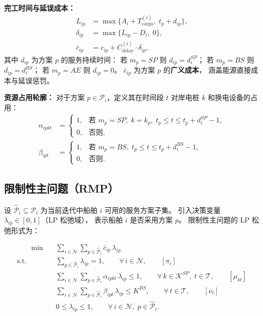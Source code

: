 \documentclass[11pt,a4paper]{article}
\begin{document}
\noindent\textbf{完工时间与延误成本：}
\begin{align}
  L_{ip} &= \max\!\Big\{A_i + T_{\text{cargo}}^{(i)},\;
    t_p + d_{ip}\Big\},
  \tag{20} \\[4pt]
  \delta_{ip} &= \max\!\big\{L_{ip} - D_i,\; 0\big\},
  \tag{21} \\[4pt]
  \bar{c}_{ip} &= c_{ip} + C_{\text{delay}}^{(i)} \cdot \delta_{ip},
  \tag{22}
\end{align}
%
其中 $d_{ip}$ 为方案 $p$ 的服务持续时间：
若 $m_p = SP$ 则 $d_{ip} = d_i^{SP}$；
若 $m_p = BS$ 则 $d_{ip} = d_i^{BS}$；
若 $m_p = AE$ 则 $d_{ip} = 0$。
$\bar{c}_{ip}$ 为方案 $p$ 的\textbf{广义成本}，
涵盖能源直接成本与延误惩罚。

\medskip
\noindent\textbf{资源占用轮廓：}
对于方案 $p \in \mathcal{P}_i$，定义其在时间段 $t$ 对岸电桩 $k$ 和换电设备的占用：
%
\begin{align}
  \alpha_{ipkt} &=
  \begin{cases}
    1, & \text{若 } m_p = SP,\; k = k_p,\;
         t_p \leq t \leq t_p + d_i^{SP} - 1, \\
    0, & \text{否则},
  \end{cases}
  \tag{23} \\[6pt]
  \beta_{ipt} &=
  \begin{cases}
    1, & \text{若 } m_p = BS,\;
         t_p \leq t \leq t_p + d_i^{BS} - 1, \\
    0, & \text{否则}.
  \end{cases}
  \tag{24}
\end{align}

\subsection{限制性主问题（RMP）}

设 $\hat{\mathcal{P}}_i \subseteq \mathcal{P}_i$ 为当前迭代中船舶 $i$
可用的服务方案子集。
引入决策变量 $\lambda_{ip} \in [0,1]$（LP 松弛域），
表示船舶 $i$ 是否采用方案 $p$。
限制性主问题的 LP 松弛形式为：

\begin{align}
  [\text{RMP}] \qquad
  \min \quad & \sum_{i \in \mathcal{N}} \sum_{p \in \hat{\mathcal{P}}_i}
    \bar{c}_{ip}\, \lambda_{ip}
  \tag{25} \\[6pt]
  \text{s.t.} \quad
  & \sum_{p \in \hat{\mathcal{P}}_i} \lambda_{ip} = 1,
    \qquad \forall\, i \in \mathcal{N},
    \qquad [\pi_i]
  \tag{26} \\[4pt]
  & \sum_{i \in \mathcal{N}} \sum_{p \in \hat{\mathcal{P}}_i}
    \alpha_{ipkt}\, \lambda_{ip} \leq 1,
    \qquad \forall\, k \in \mathcal{K}^{SP},\; t \in \mathcal{T},
    \qquad [\mu_{kt}]
  \tag{27} \\[4pt]
  & \sum_{i \in \mathcal{N}} \sum_{p \in \hat{\mathcal{P}}_i}
    \beta_{ipt}\, \lambda_{ip} \leq K^{BS},
    \qquad \forall\, t \in \mathcal{T},
    \qquad [\nu_t]
  \tag{28} \\[4pt]
  & 0 \leq \lambda_{ip} \leq 1,
    \qquad \forall\, i \in \mathcal{N},\; p \in \hat{\mathcal{P}}_i.
  \tag{29}
\end{align}
\end{document}
